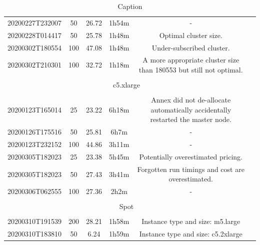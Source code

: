 \documentclass[a4paper, 10pt, conference]{ieeeconf}
\begin{document}
\begin{table}[t]
\begin{tabular}{c c c c c c }
    20200227T232007  & 50  & 26.72  & 1h54m & - \\
    20200228T014417  & 50  & 25.78  & 1h48m & Optimal cluster size. \\
    20200302T180554  & 100 & 47.08  & 1h48m & Under-subscribed cluster. \\
    20200302T210301  & 100 & 32.72  & 1h18m & A more appropriate cluster size than 180553 but still not optimal. \\
    \hline \\                
    \multicolumn{5}{c}{c5.xlarge} \\                                
    \hline \\
    \rowcolor{lightgray}                               
    20200123T165014  & 25  & 23.22  & 6h18m & Annex did not de-allocate automatically accidentally restarted the master node. \\
    \rowcolor{lightgray}                      
    20200126T175516  & 50  & 25.81  & 6h7m  & - \\
    \rowcolor{lightgray}                      
    20200123T232152  & 100 & 44.86  & 3h11m & - \\
    20200305T182023  & 25  & 23.38  & 5h45m & Potentially overestimated pricing. \\ 
    20200305T182023  & 50  & 27.43  & 3h41m & Forgotten run timings and cost are overestimated. \\
    20200306T062555  & 100 & 27.36  & 2h2m  & - \\
    \hline \\
    \multicolumn{5}{c}{Spot} \\                                     
    \hline \\
    20200310T191539  & 200 & 28.21 & 1h58m & Instance type and size: m5.large \\
    20200310T183810  & 50   & 6.24  & 1h59m & Instance type and size: c5.2xlarge
\end{tabular}
\caption{Caption}
\label{tbl:cost}
\end{table}
\end{document}
